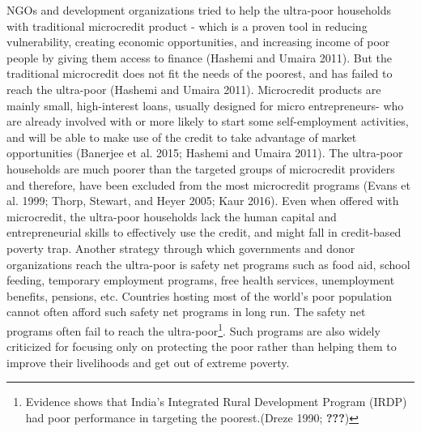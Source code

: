 \documentclass[]{article}
\let\rmarkdownfootnote\footnote%
\def\footnote{\protect\rmarkdownfootnote}
\begin{document}
NGOs and development organizations tried to help the ultra-poor
households with traditional microcredit product - which is a proven tool
in reducing vulnerability, creating economic opportunities, and
increasing income of poor people by giving them access to finance
(Hashemi and Umaira 2011). But the traditional microcredit does not fit
the needs of the poorest, and has failed to reach the ultra-poor
(Hashemi and Umaira 2011). Microcredit products are mainly small,
high-interest loans, usually designed for micro entrepreneurs- who are
already involved with or more likely to start some self-employment
activities, and will be able to make use of the credit to take advantage
of market opportunities (Banerjee et al. 2015; Hashemi and Umaira 2011).
The ultra-poor households are much poorer than the targeted groups of
microcredit providers and therefore, have been excluded from the most
microcredit programs (Evans et al. 1999; Thorp, Stewart, and Heyer 2005;
Kaur 2016). Even when offered with microcredit, the ultra-poor
households lack the human capital and entrepreneurial skills to
effectively use the credit, and might fall in credit-based poverty trap.
Another strategy through which governments and donor organizations reach
the ultra-poor is safety net programs such as food aid, school feeding,
temporary employment programs, free health services, unemployment
benefits, pensions, etc. Countries hosting most of the world's poor
population cannot often afford such safety net programs in long run. The
safety net programs often fail to reach the ultra-poor\footnote{Evidence
  shows that India's Integrated Rural Development Program (IRDP) had
  poor performance in targeting the poorest.(Dreze 1990; {\textbf{???}})}.
Such programs are also widely criticized for focusing only on protecting
the poor rather than helping them to improve their livelihoods and get
out of extreme poverty.
\end{document}
